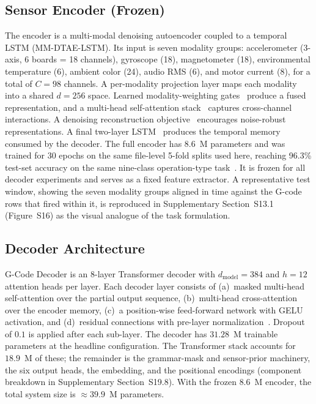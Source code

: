 \documentclass[sensors,article,submit,moreauthors,pdftex]{Definitions/mdpi}
\newcommand{\modelname}{G-Code Decoder}
\newcommand{\encname}{MM-DTAE-LSTM}
\begin{document}
\subsection{Sensor Encoder (Frozen)}
\label{sec:encoder}

The encoder is a multi-modal denoising autoencoder coupled to a temporal LSTM (\encname{}). Its input is seven modality groups: accelerometer (3-axis, 6 boards = 18 channels), gyroscope (18), magnetometer (18), environmental temperature (6), ambient color (24), audio RMS (6), and motor current (8), for a total of $C=98$ channels. A per-modality projection layer maps each modality into a shared $d=256$ space. Learned modality-weighting gates~\cite{lahat2015multimodal,ramachandram2017deep} produce a fused representation, and a multi-head self-attention stack~\cite{vaswani2017attention} captures cross-channel interactions. A denoising reconstruction objective~\cite{vincent2010stacked} encourages noise-robust representations. A final two-layer LSTM~\cite{hochreiter1997long,malhotra2015lstm} produces the temporal memory consumed by the decoder. The full encoder has 8.6~M parameters and was trained for 30 epochs on the same file-level 5-fold splits used here, reaching 96.3\% test-set accuracy on the same nine-class operation-type task~\cite{encoder_paper}. It is frozen for all decoder experiments and serves as a fixed feature extractor. A representative test window, showing the seven modality groups aligned in time against the G-code rows that fired within it, is reproduced in Supplementary Section~S13.1 (Figure~S16) as the visual analogue of the task formulation.

\subsection{Decoder Architecture}
\label{sec:decoder}

\modelname{} is an 8-layer Transformer decoder with $d_{\text{model}}=384$ and $h=12$ attention heads per layer. Each decoder layer consists of (a)~masked multi-head self-attention over the partial output sequence, (b)~multi-head cross-attention over the encoder memory, (c)~a position-wise feed-forward network with GELU activation, and (d)~residual connections with pre-layer normalization~\cite{ba2016layernorm}. Dropout~\cite{srivastava2014dropout} of $0.1$ is applied after each sub-layer. The decoder has $31.28$~M trainable parameters at the headline configuration. The Transformer stack accounts for $18.9$~M of these; the remainder is the grammar-mask and sensor-prior machinery, the six output heads, the embedding, and the positional encodings (component breakdown in Supplementary Section~S19.8). With the frozen $8.6$~M encoder, the total system size is $\approx\!39.9$~M parameters.
\end{document}
